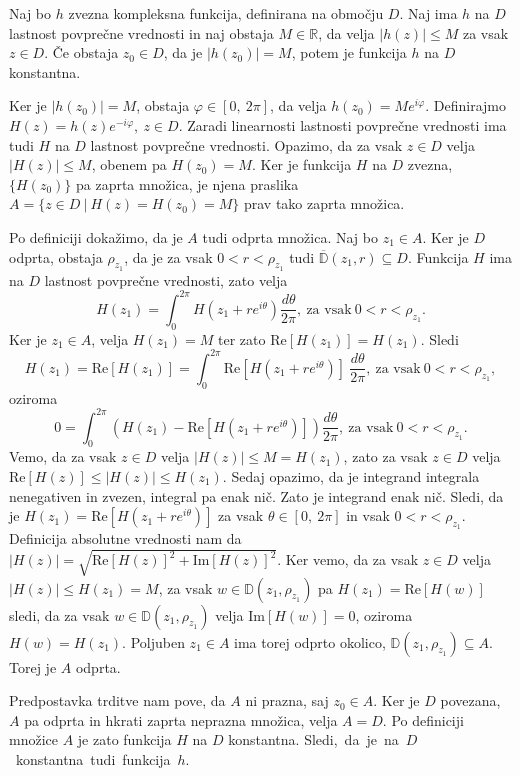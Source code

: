 \documentclass[mat1, tisk]{fmfdelo}
\begin{document}
    \begin{trditev}
        \label{pm_lpv}
        Naj bo $h$ zvezna kompleksna funkcija, definirana na območju $D$. Naj ima $h$ na $D$ lastnost povprečne vrednosti in naj obstaja $M \in \mathbb{R}$, da velja $|h(z)| \leq M$ za vsak $z \in D$. 
        Če obstaja $z_0 \in D$, da je $|h(z_0)| = M$, potem je funkcija $h$ na $D$ konstantna. 
    \end{trditev}
    \begin{dokaz}
        Ker je $|h(z_0)| = M$, obstaja $\varphi \in [0,~2\pi]$, da velja \mbox{$h(z_0) = M e^{i \varphi}$}.
        Definirajmo $H(z) = h(z) e^{-i\varphi},~z \in D$. Zaradi linearnosti lastnosti povprečne vrednosti ima tudi $H$ na $D$ lastnost povprečne vrednosti. Opazimo, da za vsak $z \in D$ velja $|H(z)|  \leq M$, obenem pa \mbox{$H(z_0) = M$}.
        Ker je funkcija $H$ na $D$ zvezna, $\{H(z_0)\}$ pa zaprta množica, je njena praslika \mbox{$A = \{z \in D~|~H(z) = H(z_0) = M\}$} prav tako zaprta množica. 
        
        Po definiciji dokažimo, da je $A$ tudi odprta množica. 
        Naj bo $z_1 \in A$. Ker je $D$ odprta, obstaja $\rho_{z_1}$, da je za vsak $0 < r < \rho_{z_1}$ tudi $\overline{\mathbb{D}}(z_1, r) \subseteq D$. 
        Funkcija $H$ ima na $D$ lastnost povprečne vrednosti, zato velja
        $$
            H(z_1) = \int_{0}^{2\pi}{H(z_1 + re^{i\theta}) \frac{d\theta}{2\pi}},~\text{za vsak}~0<r<\rho_{z_1}.
        $$
        Ker je $z_1 \in A$, velja $H(z_1) = M$ ter zato $\text{Re}[H(z_1)] = H(z_1)$. 
        Sledi
        $$
        H(z_1) = \text{Re}[H(z_1)] = \int_{0}^{2\pi}{\text{Re}[H(z_1 + re^{i\theta})]~\frac{d\theta}{2\pi}},~\text{za vsak}~0<r<\rho_{z_1},
        $$
        oziroma
        $$
        0 = \int_{0}^{2\pi}{\left(H(z_1) - \text{Re}[H(z_1 + re^{i\theta})] \right)\frac{d\theta}{2\pi}},~\text{za vsak}~0<r<\rho_{z_1}.
        $$
        Vemo, da za vsak $z \in D$ velja $|H(z)| \leq M = H(z_1)$, zato za vsak $z \in D$ velja $\text{Re}[H(z)] \leq |H(z)| \leq H(z_1)$.
        Sedaj opazimo, da je integrand integrala nenegativen in zvezen, integral pa enak nič. Zato je integrand enak nič. 
        Sledi, da je \mbox{$H(z_1) = \text{Re}[H(z_1 + r e^{i \theta})]$} za vsak $\theta \in [0,~2\pi]$ in vsak $0 < r < \rho_{z_1}$. Definicija absolutne vrednosti nam da $|H(z)| = \sqrt{\text{Re}[H(z)]^2 + \text{Im}[H(z)]^2}$. 
        Ker vemo, da za vsak $z \in D$ velja $|H(z)| \leq H(z_1) = M$, za vsak $w \in \mathbb{D}(z_1,\rho_{z_1})$ pa $H(z_1) = \text{Re}[H(w)]$ sledi, da za vsak $w \in \mathbb{D}(z_1,\rho_{z_1})$ velja $\text{Im}[H(w)] = 0$, oziroma $H(w) = H(z_1)$. 
        Poljuben $z_1 \in A$ ima torej odprto okolico, $ \mathbb{D}(z_1, \rho_{z_1}) \subseteq A$. Torej je $A$ odprta.
        
        Predpostavka trditve nam pove, da $A$ ni prazna, saj $z_0 \in A$. Ker je $D$ povezana, $A$ pa odprta in hkrati zaprta neprazna množica, velja $A = D$. 
        Po definiciji množice $A$ je zato funkcija $H$ na $D$ konstantna. \mbox{Sledi, da je na $D$ konstantna tudi funkcija $h$.} 
    \end{dokaz}
\end{document}
